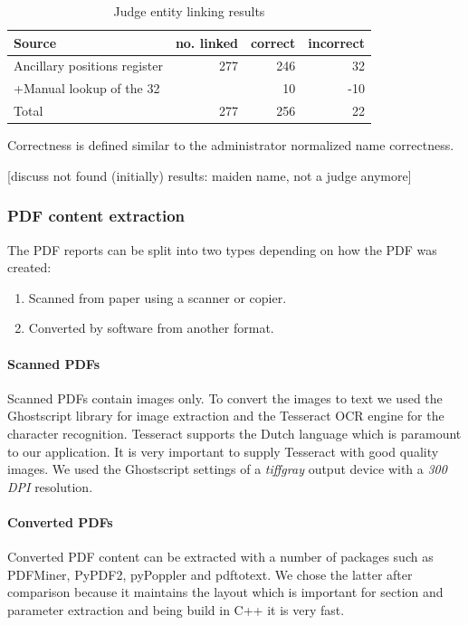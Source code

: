 \begin{table}[h]
\caption{Judge entity linking results}
\centering
\begin{tabular}{l r r r}
\hline\hline
Source & no. linked & correct & incorrect\\
\hline
Ancillary positions register & 277 & 246 & 32\\
+Manual lookup of the 32 &   & 10 & -10\\
\hline
Total & 277 & 256 & 22\\
\hline
\end{tabular}
\label{table:judge_linking}
\end{table}

Correctness is defined similar to the administrator normalized name correctness.

[discuss not found (initially) results: maiden name, not a judge anymore]

\subsubsection{PDF content extraction}
The PDF reports can be split into two types depending on how the PDF was created:
\begin{enumerate}
\item Scanned from paper using a scanner or copier.
\item Converted by software from another format.
\end{enumerate}

\paragraph{Scanned PDFs}
Scanned PDFs contain images only. To convert the images to text we used the Ghostscript library for image extraction and the Tesseract OCR engine for the character recognition. Tesseract supports the Dutch language which is paramount to our application. It is very important to supply Tesseract with good quality images. We used the Ghostscript settings of a \emph{tiffgray} output device with a \emph{300 DPI} resolution. 

\paragraph{Converted PDFs}
Converted PDF content can be extracted with a number of packages such as PDFMiner, PyPDF2, pyPoppler and pdftotext. We chose the latter after comparison because it maintains the layout which is important for section and parameter extraction and being build in C++ it is very fast.

